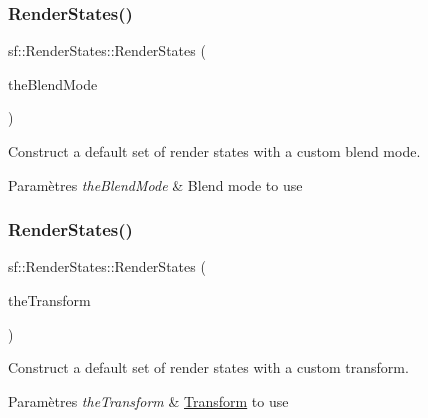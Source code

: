 \subsubsection{\texorpdfstring{Render\+States()}{RenderStates()}\hspace{0.1cm}{\footnotesize\ttfamily [2/6]}}
{\footnotesize\ttfamily sf\+::\+Render\+States\+::\+Render\+States (\begin{DoxyParamCaption}\item[{const \hyperlink{structsf_1_1BlendMode}{Blend\+Mode} \&}]{the\+Blend\+Mode }\end{DoxyParamCaption})}



Construct a default set of render states with a custom blend mode. 


\begin{DoxyParams}{Paramètres}
{\em the\+Blend\+Mode} & Blend mode to use \\
\hline
\end{DoxyParams}
\mbox{\label{classsf_1_1RenderStates_a3e99cad6ab05971d40357949930ed890}} 
\subsubsection{\texorpdfstring{Render\+States()}{RenderStates()}\hspace{0.1cm}{\footnotesize\ttfamily [3/6]}}
{\footnotesize\ttfamily sf\+::\+Render\+States\+::\+Render\+States (\begin{DoxyParamCaption}\item[{const \hyperlink{classsf_1_1Transform}{Transform} \&}]{the\+Transform }\end{DoxyParamCaption})}



Construct a default set of render states with a custom transform. 


\begin{DoxyParams}{Paramètres}
{\em the\+Transform} & \hyperlink{classsf_1_1Transform}{Transform} to use \\
\hline
\end{DoxyParams}
\mbox{\label{classsf_1_1RenderStates_a8f4ca3be0e27dafea0c4ab8547439bb1}} 

